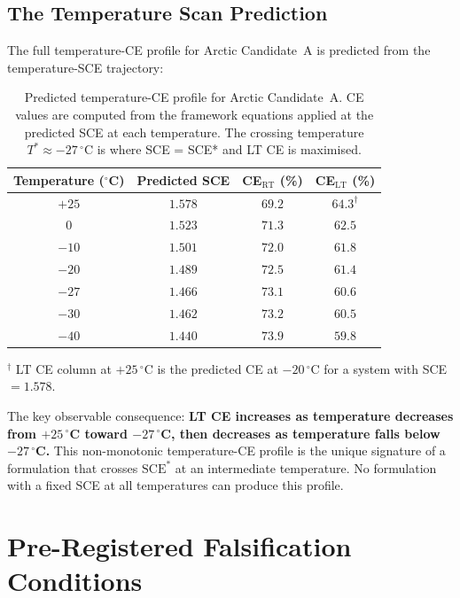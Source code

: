 \documentclass[11pt]{article}
\theoremstyle{plain}
\theoremstyle{definition}
\theoremstyle{remark}
\begin{document}
\subsection{The Temperature Scan Prediction}

The full temperature-CE profile for Arctic Candidate~A is predicted
from the temperature-SCE trajectory:

\begin{table}[h!]
\centering
\caption{Predicted temperature-CE profile for Arctic Candidate~A.
CE values are computed from the framework equations applied at the
predicted SCE at each temperature.  The crossing temperature
$T^{*} \approx -27\,^\circ$C is where SCE = SCE* and LT CE is
maximised.}
\label{tab:temp_scan}
\begin{tabular}{cccc}
\toprule
Temperature ($^\circ$C) & Predicted SCE & CE$_\mathrm{RT}$ (\%) &
  CE$_\mathrm{LT}$ (\%) \\
\midrule
$+25$ & $1.578$ & $69.2$ & $64.3^{\dagger}$ \\
$0$   & $1.523$ & $71.3$ & $62.5$ \\
$-10$ & $1.501$ & $72.0$ & $61.8$ \\
$-20$ & $1.489$ & $72.5$ & $61.4$ \\
$-27$ & $1.466$ & $73.1$ & $60.6$ \\
$-30$ & $1.462$ & $73.2$ & $60.5$ \\
$-40$ & $1.440$ & $73.9$ & $59.8$ \\
\bottomrule
\end{tabular}
\vspace{0.5em}
{\small $^{\dagger}$ LT CE column at $+25\,^\circ$C is the predicted
CE at $-20\,^\circ$C for a system with SCE $= 1.578$.}
\end{table}

The key observable consequence: \textbf{LT CE increases as
temperature decreases from $+25\,^\circ$C toward $-27\,^\circ$C,
then decreases as temperature falls below $-27\,^\circ$C.}
This non-monotonic temperature-CE profile is the unique signature
of a formulation that crosses $\mathrm{SCE}^{*}$ at an intermediate
temperature.  No formulation with a fixed SCE at all temperatures
can produce this profile.

\section{Pre-Registered Falsification Conditions}
\label{sec:falsification}
\end{document}
